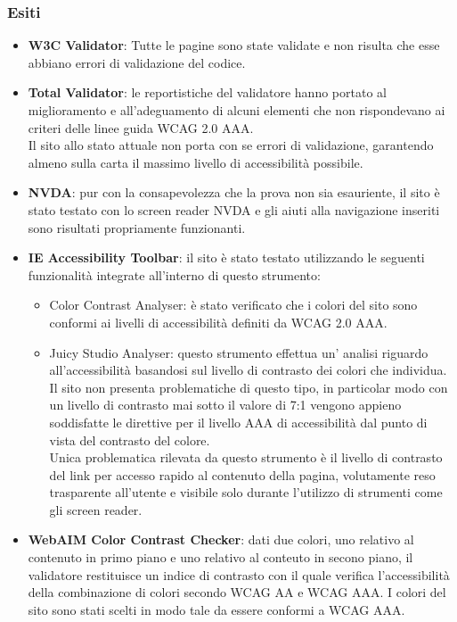 \documentclass[a4paper,12pt]{article}
\begin{document}
\subsubsection{Esiti}
\begin{itemize}
	\item \textbf{W3C Validator}: Tutte le pagine sono state validate e non risulta che esse abbiano errori di validazione del codice.
	
	\item \textbf{Total Validator}: le reportistiche del validatore hanno portato al miglioramento e all'adeguamento di alcuni elementi che non rispondevano  ai criteri delle linee guida WCAG 2.0 AAA.\\
	Il sito allo stato attuale non porta con se errori di validazione, garantendo almeno sulla carta il massimo livello di accessibilità possibile.
	
	\item \textbf{NVDA}: pur con la consapevolezza che la prova non sia esauriente, il sito è stato testato con lo screen reader NVDA e gli aiuti alla navigazione inseriti sono risultati
	propriamente funzionanti.
	
	\item \textbf{IE Accessibility Toolbar}: il sito è stato testato utilizzando le seguenti funzionalità integrate all'interno di questo strumento:
	\begin{itemize}
		\item Color Contrast Analyser: è stato verificato che i colori del sito sono conformi ai livelli di accessibilità definiti da WCAG 2.0 AAA.
		
		\item Juicy Studio Analyser: questo strumento effettua un' analisi riguardo all'accessibilità basandosi sul livello di contrasto dei colori che individua.\\
		Il sito non presenta problematiche di questo tipo, in particolar modo con un livello di contrasto mai sotto il valore di 7:1 vengono appieno soddisfatte le direttive per il livello AAA di accessibilità dal punto di vista del contrasto del colore.\\
		Unica problematica rilevata da questo strumento è il livello di contrasto del link per accesso rapido al contenuto della pagina, volutamente reso trasparente all'utente e visibile solo durante l'utilizzo di strumenti come gli screen reader.
	\end{itemize}
		
	\item \textbf{WebAIM Color Contrast Checker}: dati due colori, uno relativo al contenuto in
	primo piano e uno relativo al conteuto in secono piano, il validatore restituisce un
	indice di contrasto con il quale verifica l’accessibilità della combinazione di colori
	secondo WCAG AA e WCAG AAA. I colori del sito sono stati scelti in modo tale
	da essere conformi a WCAG AAA.
	

\end{itemize}
\end{document}
